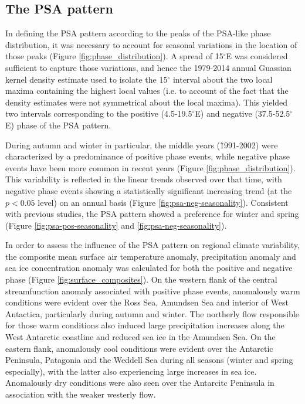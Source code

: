\subsection{The PSA pattern}

In defining the PSA pattern according to the peaks of the PSA-like phase distribution, it was necessary to account for seasonal variations in the location of those peaks (Figure \ref{fig:phase_distribution}). A spread of 15$^{\circ}$E was considered sufficient to capture those variations, and hence the 1979-2014 annual Guassian kernel density estimate used to isolate the 15$^{\circ}$ interval about the two local maxima containing the highest local values (i.e. to account of the fact that the density estimates were not symmetrical about the local maxima). This yielded two intervals corresponding to the positive (4.5-19.5$^{\circ}$E) and negative (37.5-52.5$^{\circ}$E) phase of the PSA pattern.

During autumn and winter in particular, the middle years (\~1991-2002) were characterized by a predominance of positive phase events, while negative phase events have been more common in recent years (Figure \ref{fig:phase_distribution}). This variability is reflected in the linear trends observed over that time, with negative phase events showing a statistically significant increasing trend (at the $p < 0.05$ level) on an annual basis (Figure \ref{fig:psa-neg-seasonality}). Consistent with previous studies, the PSA pattern showed a preference for winter and spring (Figure \ref{fig:psa-pos-seasonality} and \ref{fig:psa-neg-seasonality}).

In order to assess the influence of the PSA pattern on regional climate variability, the composite mean surface air temperature anomaly, precipitation anomaly and sea ice concentration anomaly was calculated for both the positive and negative phase (Figure \ref{fig:surface_composites}). On the western flank of the central streamfunction anomaly associated with positive phase events, anomalously warm conditions were evident over the Ross Sea, Amundsen Sea and interior of West Antactica, particularly during autumn and winter. The northerly flow responsible for those warm conditions also induced large precipitation increases along the West Antarctic coastline and reduced sea ice in the Amundsen Sea. On the eastern flank, anomalously cool conditions were evident over the Antarctic Peninsula, Patagonia and the Weddell Sea during all seasons (winter and spring especially), with the latter also experiencing large increases in sea ice. Anomalously dry conditions were also seen over the Antarcitc Peninsula in association with the weaker westerly flow. 

